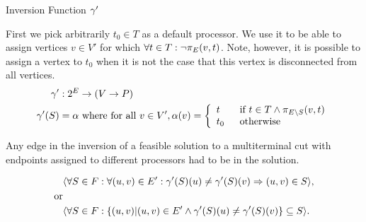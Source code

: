 \begin{definition}
Inversion Function $\gamma'$

First we pick arbitrarily $t_0 \in T$ as a default processor.
We use it to be able to assign vertices $v \in V'$ for which $\forall t \in T : \neg\pi_{E}(v, t)$.
Note, however, it is possible to assign a vertex to $t_0$ when it is not the case that this vertex is disconnected from all vertices.
\begin{align}
	\nonumber \gamma' & : 2^E \rightarrow (V \rightarrow P) \\
	\nonumber \gamma'(S) & = \alpha \mbox{ where for all } v \in V', \alpha(v) = \mbox{$\left\{ 
		\begin{array}{l l}
			t \quad & \mbox{if $t \in T \wedge \pi_{E \setminus S}(v, t)$}\\
			t_0 & \mbox{otherwise}\\ \end{array} \right.$} 
\end{align}

\end{definition}

\begin{lemma}
\label{INVERSESUBSET}
Any edge in the inversion of a feasible solution to a multiterminal cut with endpoints assigned to different processors had to be in the solution.

\begin{align}
	\nonumber & \langle \forall S \in F : \forall (u, v) \in E' : \gamma'(S)(u) \neq \gamma'(S)(v) \Rightarrow (u,v) \in S \rangle ,\\
	\nonumber \mbox{or} &\\
	\nonumber & \langle \forall S \in F : \{(u,v) |(u, v) \in E' \wedge \gamma'(S)(u) \neq \gamma'(S)(v)\} \subseteq S \rangle .
\end{align}
\end{lemma}

